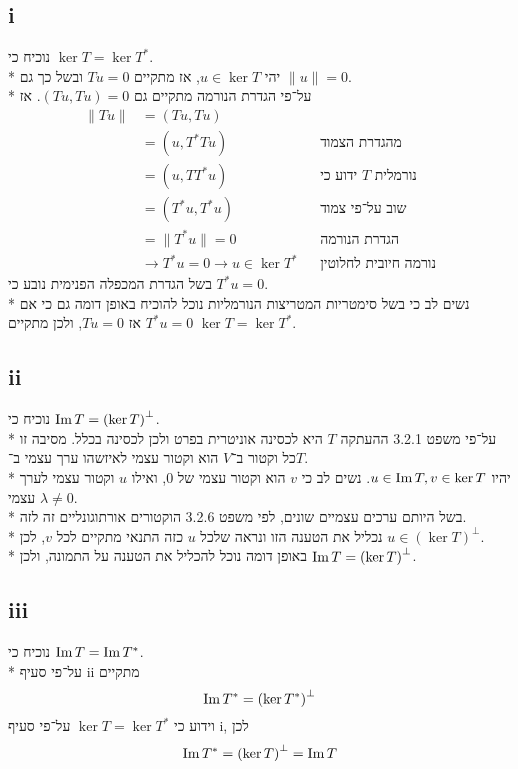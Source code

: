 \subsection{i}
נוכיח כי $\ker T = \ker T^*$. \\*
יהי $u \in \ker T$, אז מתקיים $T u = 0$ ובשל כך גם $\lVert u \rVert = 0$. \\*
על־פי הגדרת הנורמה מתקיים גם $(T u, T u) = 0$. אז
\begin{align*}
	\lVert T u \rVert & = (T u, T u) \\
					  & = (u, T^* T u) && \text{מהגדרת הצמוד} \\
					  & = (u, T T^* u) && \text{ידוע כי $T$ נורמלית} \\
					  & = (T^* u, T^* u) && \text{שוב על־פי צמוד} \\
					  & = \lVert T^* u \rVert = 0 && \text{הגדרת הנורמה} \\
					  & \rightarrow T^* u = 0 \rightarrow u \in \ker T^* && \text{נורמה חיובית לחלוטין}
\end{align*}
בשל הגדרת המכפלה הפנימית נובע כי $T^* u = 0$. \\*
נשים לב כי בשל סימטריות המטריצות הנורמליות נוכל להוכיח באופן דומה גם כי אם $T^* u = 0$ אז $T u = 0$,
ולכן מתקיים $\ker T = \ker T^*$.

\subsection{ii}
נוכיח כי $\operatorname{Im} T = {(\ker T)}^\perp$. \\*
על־פי משפט 3.2.1 ההעתקה $T$ היא לכסינה אוניטרית בפרט ולכן לכסינה בכלל.
מסיבה זו כל וקטור ב־$V$ הוא וקטור עצמי לאיזשהו ערך עצמי ב־$T$. \\*
יהיו $u \in \operatorname{Im} T, v \in \ker T$. נשים לב כי $v$ הוא וקטור עצמי של $0$, ואילו $u$ וקטור עצמי לערך עצמי $\lambda \ne 0$. \\*
בשל היותם ערכים עצמיים שונים, לפי משפט 3.2.6 הוקטורים אורתוגונליים זה לזה. \\*
נכליל את הטענה הזו ונראה שלכל $u$ כזה התנאי מתקיים לכל $v$, לכן $u \in {(\ker T)}^\perp$. \\*
באופן דומה נוכל להכליל את הטענה על התמונה, ולכן $\operatorname{Im} T = {(\ker T)}^\perp$.

\subsection{iii}
נוכיח כי $\operatorname{Im} T = \operatorname{Im} T^*$. \\*
על־פי סעיף ii מתקיים
\[
	\operatorname{Im} T^* = {(\ker T^*)}^\perp
\]
וידוע כי $\ker T = \ker T^*$ על־פי סעיף i, לכן
\[
	\operatorname{Im} T^* = {(\ker T)}^\perp = \operatorname{Im} T
\]

